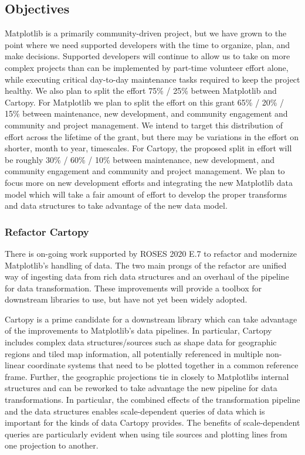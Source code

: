 \documentclass[12pt]{article}
\numberwithin{page}{section}
\begin{document}
\subsection{Objectives}


Matplotlib is a primarily community-driven project, but we have grown to the
point where we need supported developers with the time to organize, plan, and
make decisions.  Supported developers will continue to allow us to take on more
complex projects than can be implemented by part-time volunteer effort alone,
while executing critical day-to-day maintenance tasks required to keep the
project healthy.  We also plan to split the effort 75\% / 25\% between
Matplotlib and Cartopy.  For Matplotlib we plan to split the effort on this
grant 65\% / 20\% / 15\% between maintenance, new development, and community
engagement and community and project management.  We intend to target this distribution
of effort across the lifetime of the grant, but there may be variations in the effort
on shorter, month to year, timescales.
For Cartopy, the proposed split in effort will be roughly 30\% / 60\% / 10\%
between maintenance, new development, and community engagement and community
and project management.  We plan to focus more on new development efforts and
integrating the new Matplotlib data model which will take a fair amount of
effort to develop the proper transforms and data structures to take advantage
of the new data model.


\subsubsection{Refactor Cartopy}

There is on-going work supported by ROSES 2020 E.7 to refactor and modernize
Matplotlib's handling of data.  The two main prongs of the refactor are unified
way of ingesting data from rich data structures and an overhaul of the pipeline
for data transformation.  These improvements will provide a toolbox for
downstream libraries to use, but have not yet been widely adopted.

Cartopy is a prime candidate for a downstream library which can take advantage
of the improvements to Matplotlib's data pipelines.
In particular, Cartopy includes complex %
data structures/sources
such as shape data for geographic regions and tiled map information, all potentially
referenced in multiple non-linear coordinate systems that need to be plotted together
in a common reference frame.
Further, the geographic projections tie in closely to Matplotlibs internal structures
and can be reworked to take advantage the new pipeline for data transformations.
In particular, the combined effects of the transformation pipeline and the data
structures enables scale-dependent queries of data which is important for the kinds of data Cartopy provides.
The benefits of scale-dependent queries are particularly evident when using tile sources and
plotting lines from one projection to another.
\end{document}
